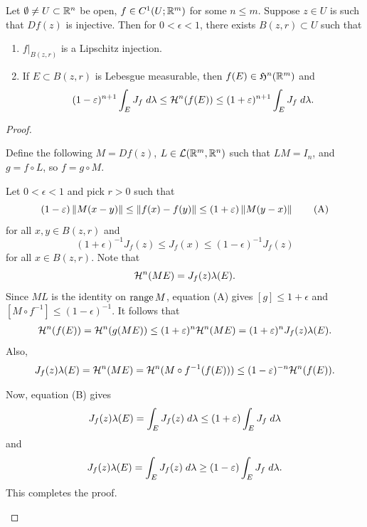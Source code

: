 \documentclass[a4paper]{article}
\begin{document}
\begin{lemma}
Let $\emptyset \neq U \subset \mathbb{R}^n$ be open, $f \in C^1 (U ; \mathbb{R}^m)$
for some $n \leq m$. Suppose $z \in U$ is such that 
$Df(z)$ is injective. Then for $0 < \epsilon < 1$, there 
exists $B(z, r) \subset U$ such that 
\begin{enumerate}
\item $f \vert_{B(z, r)}$ is a Lipschitz injection.
\item If $E \subset B(z, r)$ is Lebesgue measurable, 
then $f(E) \in \mathfrak{H}^n (\mathbb{R}^m)$ and 
\[
(1 - \varepsilon)^{n+1} 
\int_E J_f \; d \lambda 
\leq \mathcal{H}^n (f(E)) \leq 
(1 + \varepsilon)^{n+1} \int_E J_f \; d \lambda.
\]
\end{enumerate}
\end{lemma}

\begin{proof}
\begin{enumerate}
Define the following $M = Df(z)$, $L \in \mathcal{L}(\mathbb{R}^m, \mathbb{R}^n)$
such that $L M = I_n$, and $g = f \circ L$, so $f = g \circ M$.

Let $0 < \epsilon < 1$ and pick $r > 0$ such that 
\begin{equation*}
  (1 - \varepsilon) \left\lVert M (x - y)\right\rVert 
  \leq \left\lVert f(x) - f(y)\right\rVert \leq 
  (1 + \varepsilon) \left\lVert M (y - x)\right\rVert
  \tag{A}
\end{equation*}
for all $x, y \in B(z, r)$ 
and 
\begin{equation*}
  (1 + \epsilon)^{-1} J_f(z) 
  \leq J_f(x) \leq
  (1 - \epsilon)^{-1} J_f(z)
  \tag{B}
\end{equation*}
for all $x \in B(z, r)$. Note that 
\[
\mathcal{H}^n (ME) = J_f(z) \lambda(E). 
\]
Since $ML$ is the identity on $\operatorname{range} M$, 
equation (A) gives $[g] \leq 1 + \epsilon$ and 
$[M \circ f^{-1}] \leq (1 - \epsilon)^{-1}$. 
It follows that 
\[
\begin{aligned}
\mathcal{H}^n (f(E)) = \mathcal{H}^n(g(ME)) 
\leq (1 + \varepsilon)^n \mathcal{H}^n (ME) 
= (1 + \varepsilon)^n J_f(z) \lambda(E).
\end{aligned}
\]
Also, 
\[
J_f(z) \lambda (E) = \mathcal{H}^n (ME) 
= \mathcal{H}^n (M \circ f^{-1} (f(E))) 
\leq (1 - \varepsilon)^{-n} \mathcal{H}^n (f(E)).
\]

Now, equation (B) gives 
\[
J_f(z) \lambda(E) 
= \int_E J_f(z) \; d \lambda 
\leq (1 + \varepsilon) \int_E J_f \; d \lambda
\]
and 
\[
J_f(z) \lambda(E)
= \int_E J_f(z) \; d \lambda 
\geq (1 - \varepsilon) \int_E J_f \; d \lambda.
\]
This completes the proof.

\end{enumerate}
\end{proof}
\end{document}

